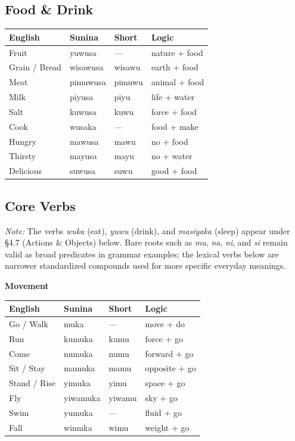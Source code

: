 \documentclass[12pt, a4paper]{article}
\begin{document}
\subsection{Food \& Drink}
\begin{tabular}{@{}llll@{}}
\toprule
\textbf{English} & \textbf{Sunina} & \textbf{Short} & \textbf{Logic} \\ \midrule
Fruit & yuwusa & --- & nature + food \\
Grain / Bread & wisawusa & wisawu & earth + food \\
Meat & pimuwusa & pimuwu & animal + food \\
Milk & piyusa & piyu & life + water \\
Salt & kuwusa & kuwu & force + food \\
Cook & wusaka & --- & food + make \\
Hungry & mawusa & mawu & no + food \\
Thirsty & mayusa & mayu & no + water \\
Delicious & suwusa & suwu & good + food \\
\bottomrule
\end{tabular}

\subsection{Core Verbs}
\textit{Note:} The verbs \textit{wuka} (eat), \textit{yuwu} (drink), and \textit{masiyaka} (sleep) appear under \S4.7 (Actions \& Objects) below. Bare roots such as \textit{mu}, \textit{na}, \textit{ni}, and \textit{si} remain valid as broad predicates in grammar examples; the lexical verbs below are narrower standardized compounds used for more specific everyday meanings.

\medskip
\noindent\textbf{Movement}
\begin{tabular}{@{}llll@{}}
\toprule
\textbf{English} & \textbf{Sunina} & \textbf{Short} & \textbf{Logic} \\ \midrule
Go / Walk & muka & --- & move + do \\
Run & kumuka & kumu & force + go \\
Come & numuka & numu & forward + go \\
Sit / Stay & mamuka & mamu & opposite + go \\
Stand / Rise & yimuka & yimu & space + go \\
Fly & yiwamuka & yiwamu & sky + go \\
Swim & yumuka & --- & fluid + go \\
Fall & wimuka & wimu & weight + go \\
\bottomrule
\end{tabular}
\end{document}
